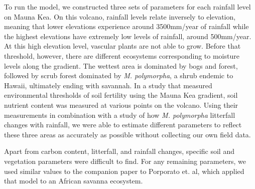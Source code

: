 \documentclass[12pt, letterpaper]{article}
\begin{document}
To run the model, we constructed three sets of parameters for each rainfall level on Mauna Kea. On this volcano, rainfall levels relate inversely to elevation, meaning that lower elevations experience around 3500mm/year of rainfall while the highest elevations have extremely low levels of rainfall, around 500mm/year. At this high elevation level, vascular plants are not able to grow. Before that threshold, however, there are different ecosystems corresponding to moisture levels along the gradient. The wettest area is dominated by bogs and forest, followed by scrub forest dominated by \textit{M. polymorpha}, a shrub endemic to Hawaii, ultimately ending with savannah. In a study that measured environmental thresholds of soil fertility using the Mauna Kea gradient, soil nutrient content was measured at various points on the volcano. Using their measurements in combination with a study of how \textit{M. polymorpha} litterfall changes with rainfall, we were able to estimate different parameters to reflect these three areas as accurately as possible without collecting our own field data. \cite{bateman_quantitative_2019}

Apart from carbon content, litterfall, and rainfall changes, specific soil and vegetation parameters were difficult to find. For any remaining parameters, we used similar values to the companion paper to Porporato et. al, which applied that model to an African savanna ecosystem. \cite{dodorico_hydrologic_2003}
\end{document}
